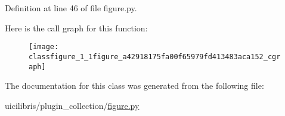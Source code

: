 \-Definition at line 46 of file figure.\-py.



\-Here is the call graph for this function\-:
\nopagebreak
\begin{figure}[H]
\begin{center}
\leavevmode
\texttt{[image: classfigure\_1\_1figure\_a42918175fa00f65979fd413483aca152\_cgraph]}
\end{center}
\end{figure}




\-The documentation for this class was generated from the following file\-:\begin{DoxyCompactItemize}
\item 
uicilibris/plugin\-\_\-collection/\hyperlink{figure_8py}{figure.\-py}\end{DoxyCompactItemize}
